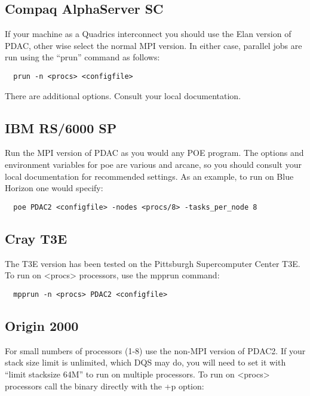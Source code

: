 \subsection{Compaq AlphaServer SC}

If your machine as a Quadrics interconnect you should use the Elan
version of PDAC, other wise select the normal MPI version.  In either
case, parallel jobs are run using the ``prun'' command as follows:

\begin{verbatim}
  prun -n <procs> <configfile>
\end{verbatim}

There are additional options.  Consult your local documentation.

\subsection{IBM RS/6000 SP}

Run the MPI version of PDAC as you would any POE program.  The options
and environment variables for poe are various and arcane, so you should
consult your local documentation for recommended settings.  As an
example, to run on Blue Horizon one would specify:

\begin{verbatim}
  poe PDAC2 <configfile> -nodes <procs/8> -tasks_per_node 8
\end{verbatim}

\subsection{Cray T3E}

The T3E version has been tested on the Pittsburgh Supercomputer Center
T3E.  To run on <procs> processors, use the mpprun command:

\begin{verbatim}
  mpprun -n <procs> PDAC2 <configfile>
\end{verbatim}

\subsection{Origin 2000}

For small numbers of processors (1-8) use the non-MPI version of PDAC2.
If your stack size limit is unlimited, which DQS may do, you will need
to set it with ``limit stacksize 64M'' to run on multiple processors.
To run on <procs> processors call the binary directly with the +p option:

